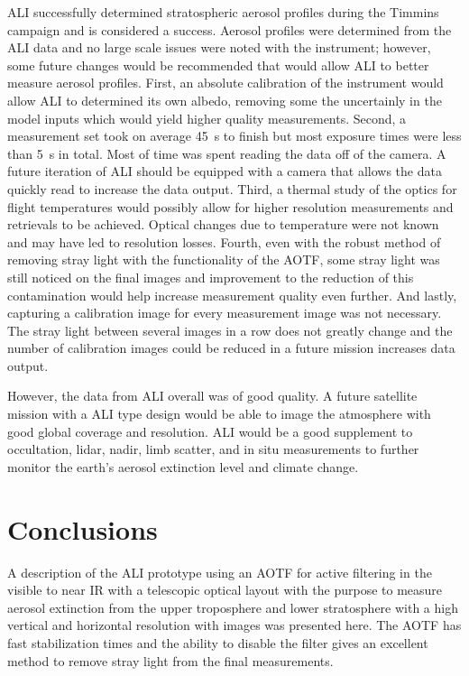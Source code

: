 \documentclass[12pt]{article}
\begin{document}
ALI successfully determined stratospheric aerosol profiles during the Timmins campaign and is considered a success. Aerosol profiles were determined from the ALI data and no large scale issues were noted with the instrument; however, some future changes would be recommended that would allow ALI to better measure aerosol profiles. First, an absolute calibration of the instrument would allow ALI to determined its own albedo, removing some the uncertainly in the model inputs which would yield higher quality measurements. Second, a measurement set took on average 45~s to finish but most exposure times were less than 5~s in total. Most of time was spent reading the data off of the camera. A future iteration of ALI should be equipped with a camera that allows the data quickly read to increase the data output. Third, a thermal study of the optics for flight temperatures would possibly allow for higher resolution measurements and retrievals to be achieved. Optical changes due to temperature were not known and may have led to resolution losses. Fourth, even with the robust method of removing stray light with the functionality of the AOTF, some stray light was still noticed on the final images and improvement to the reduction of this contamination would help increase measurement quality even further. And lastly, capturing a calibration image for every measurement image was not necessary. The stray light between several images in a row does not greatly change and the number of calibration images could be reduced in a future mission increases data output.

However, the data from ALI overall was of good quality. A future satellite mission with a ALI type design would be able to image the atmosphere with good global coverage and resolution. ALI would be a good supplement to occultation, lidar, nadir, limb scatter, and in situ measurements to further monitor the earth's aerosol extinction level and climate change.

\section{Conclusions}

A description of the ALI prototype using an AOTF for active filtering in the visible to near IR with a telescopic optical layout with the purpose to measure aerosol extinction from the upper troposphere and lower stratosphere with a high vertical and horizontal resolution with images was presented here. The AOTF has fast stabilization times and the ability to disable the filter gives an excellent method to remove stray light from the final measurements.
\end{document}
